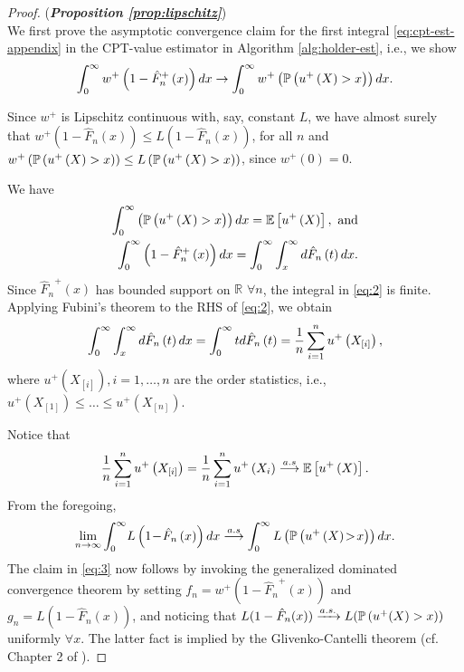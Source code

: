 \begin{proof}(\textbf{\textit{Proposition \ref{prop:lipschitz}}})\ \\
We first prove the asymptotic convergence claim for the first integral  \eqref{eq:cpt-est-appendix} in the CPT-value estimator in Algorithm \ref{alg:holder-est}, i.e., we show
\begin{align}
\int_0^{\infty} w^+\left(1-{\hat F_n}^+\left(x\right)\right)  dx \rightarrow \int_0^{\infty} w^+\left(\mathbb{P}\left( u^+\left(X\right)>x \right)\right) dx.\label{eq:3}
\end{align} 

Since $w^+$ is Lipschitz continuous with, say, constant $L$, we have almost surely that
$w^{+}\left(1-\hat{F}_n\left(x\right)\right) \leq L \left(1-\hat{F}_n\left(x\right)\right)$,  
for all $n$ and 
 $w^{+}\left(\mathbb{P}\left( u^+\left(X\right)>x \right)\right) \leq L \left(\mathbb{P}\left( u^+\left(X\right)>x \right)\right)$, since $w^+\left(0\right)=0$.
 

We have
\begin{align}
\int_0^{\infty} \left(\mathbb{P}\left( u^+\left(X\right)>x \right)\right)  dx = \mathbb{E}\left[u^+\left(X\right)\right], \text{ and} \nonumber\\
\int_0^{\infty} \left(1-{\hat F_n}^+\left(x\right)\right)  dx =\int_0^{\infty} \int_x^\infty d \hat{F}_n\left(t\right) dx.\label{eq:2}
\end{align}
Since ${\hat F_n}^+\left(x\right)$ has bounded support on $\mathbb{R}$ $\forall n$, the integral in \eqref{eq:2} is finite.
Applying Fubini's theorem to the RHS of \eqref{eq:2}, we obtain
\begin{align*}
\intinfinity \int_x^\infty d \hat{F}_n\left(t\right) dx %
= \intinfinity t d\hat{F}_n\left(t\right) = \frac{1}{n} \sum_{i=1}^n u^+\left(X_{[i]}\right),
 \end{align*}
 where $u^+\left(X_{[i]}\right), i=1,\ldots,n$ are the order statistics, i.e., $u^+\left(X_{[1]}\right) \le \ldots \le u^+\left(X_{[n]}\right)$.
 
Notice that 
\begin{align*}
\frac{1}{n}
\sum_{i=1}^n u^+\left(X_{[i]}\right)
=
\frac{1}{n}
\sum_{i=1}^n u^+\left(X_{i}\right)
\overset{a.s}\longrightarrow 
\mathbb{E}\left[u^+\left(X\right)\right].
\end{align*}
From the foregoing,
\begin{align*}
\lim_{n\rightarrow \infty} \int_0^{\infty} \!L\left(1\!-\!\hat{F}_n\left(x\right)\right) dx
\overset{a.s} \longrightarrow
\int_0^{\infty} L \left(\mathbb{P}\left( u^+\left(X\right)\!>\!x \right)\right) dx.
\end{align*}
The claim in \eqref{eq:3} now follows by invoking the generalized dominated convergence theorem by setting $f_n = w^+(1-{\hat F_n}^+(x))$ and $g_n = L(1-\hat{F}_n(x))$, and noticing that $L(1-\hat{F}_n(x)) \xrightarrow{a.s.} L(\mathbb{P}\left( u^+(X)>x \right))$ uniformly $\forall x$. The latter fact is implied by the Glivenko-Cantelli theorem (cf. Chapter 2 of \cite{wasserman2006}).


\end{proof}
